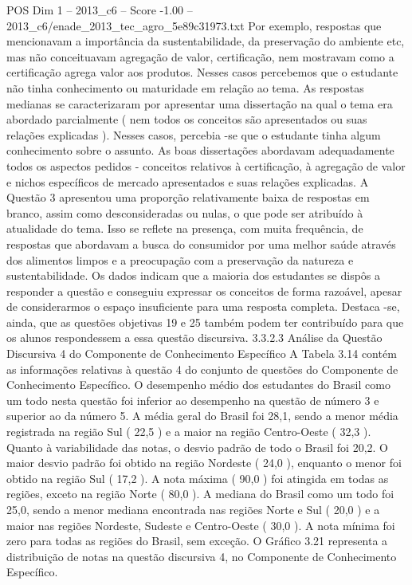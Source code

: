 \begin{textsample}{POS Dim 1 – 2013\_c6 – Score -1.00 – 2013\_c6/enade\_2013\_tec\_agro\_5e89c31973.txt}
Por exemplo, respostas que mencionavam a importância da sustentabilidade, da preservação do ambiente etc, mas não conceituavam agregação de valor, certificação, nem mostravam como a certificação agrega valor aos produtos.
Nesses casos percebemos que o estudante não tinha conhecimento ou maturidade em relação ao tema.
As respostas medianas se caracterizaram por apresentar uma dissertação na qual o tema era abordado parcialmente ( nem todos os conceitos são apresentados ou suas relações explicadas ).
Nesses casos, percebia -se que o estudante tinha algum conhecimento sobre o assunto.
As boas dissertações abordavam adequadamente todos os aspectos pedidos - conceitos relativos à certificação, à agregação de valor e nichos específicos de mercado apresentados e suas relações explicadas.
A Questão 3 apresentou uma proporção relativamente baixa de respostas em branco, assim como desconsideradas ou nulas, o que pode ser atribuído à atualidade do tema.
Isso se reflete na presença, com muita frequência, de respostas que abordavam a busca do consumidor por uma melhor saúde através dos alimentos limpos e a preocupação com a preservação da natureza e sustentabilidade.
Os dados indicam que a maioria dos estudantes se dispôs a responder a questão e conseguiu expressar os conceitos de forma razoável, apesar de considerarmos o espaço insuficiente para uma resposta completa.
Destaca -se, ainda, que as questões objetivas 19 e 25 também podem ter contribuído para que os alunos respondessem a essa questão discursiva. 3.3.2.3 Análise da Questão Discursiva 4 do Componente de Conhecimento Específico A Tabela 3.14 contém as informações relativas à questão 4 do conjunto de questões do Componente de Conhecimento Específico.
O desempenho médio dos estudantes do Brasil como um todo nesta questão foi inferior ao desempenho na questão de número 3 e superior ao da número 5.
A média geral do Brasil foi 28,1, sendo a menor média registrada na região Sul ( 22,5 ) e a maior na região Centro-Oeste ( 32,3 ).
Quanto à variabilidade das notas, o desvio padrão de todo o Brasil foi 20,2.
O maior desvio padrão foi obtido na região Nordeste ( 24,0 ), enquanto o menor foi obtido na região Sul ( 17,2 ).
A nota máxima ( 90,0 ) foi atingida em todas as regiões, exceto na região Norte ( 80,0 ).
A mediana do Brasil como um todo foi 25,0, sendo a menor mediana encontrada nas regiões Norte e Sul ( 20,0 ) e a maior nas regiões Nordeste, Sudeste e Centro-Oeste ( 30,0 ).
A nota mínima foi zero para todas as regiões do Brasil, sem exceção.
O Gráfico 3.21 representa a distribuição de notas na questão discursiva 4, no Componente de Conhecimento Específico.

\end{textsample}
